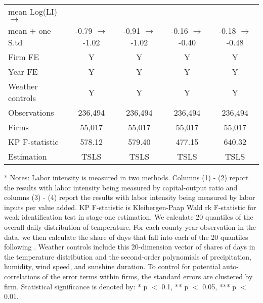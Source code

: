 \documentclass[12pt]{article}
\begin{document}
\begin{table}[H]
{\begin{tabular}{l*{4}{c}}
    mean  Log(LI) $\rightarrow$       &&&&\\ 
    mean + one S.td &-0.79 $\rightarrow$ -1.02&	  -0.91 $\rightarrow$ -1.02&            	     -0.16 $\rightarrow$ -0.40&	    -0.18 $\rightarrow$ -0.48\\
    \hline
    Firm FE &Y&Y&Y&Y\\
    Year FE &Y&Y&Y&Y\\
    Weather controls &Y&Y&Y&Y\\
    \hline
    Observations 	&236,494	&236,494&	236,494	&236,494 \\
    Firms	       &55,017	&55,017	&55,017	&55,017 \\
    KP F-statistic	       &578.12	&579.40	&477.15	&640.32 \\
    Estimation      &TSLS&TSLS&TSLS&TSLS\\
    \hline\hline
  \end{tabular}
  }
  \begin{tablenotes}
    \item[*] \small Notes: Labor intensity is measured in two methods. Columns (1) - (2) report the results with labor intensity being measured by capital-output ratio and columns (3) - (4) report the results with labor intensity being measured by labor inputs per value added.  KP F-statistic is Kleibergen-Paap Wald rk F-statistic for weak identification test in stage-one estimation. We calculate 20 quantiles of the overall daily distribution of temperature. For each county-year observation in the data, we then calculate the share of days that fall into each of the 20 quantiles following \citep{deschenes2017defensive}. Weather controls include this 20-dimension vector of shares of days in the temperature distribution and the second-order polynomials of precipitation, humidity, wind speed, and sunshine duration. To control for potential auto-correlations of the error terms within firms, the standard errors are clustered by firm. Statistical significance is denoted by: * p $<$ 0.1, ** p $<$ 0.05, *** p $<$ 0.01.
  \end{tablenotes}
  \end{table}
\end{document}
